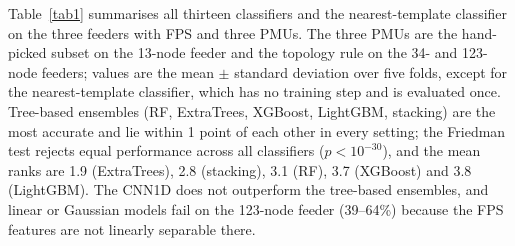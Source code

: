 \documentclass[11pt]{article}
\newenvironment{nw}{}{}
\begin{document}
\begin{nw}
Table~\ref{tab1} summarises all thirteen classifiers and the nearest-template classifier on the three feeders with FPS and three PMUs. The three PMUs are the hand-picked subset on the 13-node feeder and the topology rule on the 34- and 123-node feeders; values are the mean $\pm$ standard deviation over five folds, except for the nearest-template classifier, which has no training step and is evaluated once. Tree-based ensembles (RF, ExtraTrees, XGBoost, LightGBM, stacking) are the most accurate and lie within 1 point of each other in every setting; the Friedman test rejects equal performance across all classifiers ($p<10^{-30}$), and the mean ranks are 1.9 (ExtraTrees), 2.8 (stacking), 3.1 (RF), 3.7 (XGBoost) and 3.8 (LightGBM). The CNN1D does not outperform the tree-based ensembles, and linear or Gaussian models fail on the 123-node feeder (39--64\%) because the FPS features are not linearly separable there.

\end{nw}
\end{document}
